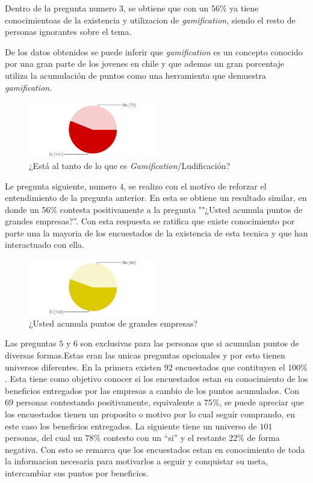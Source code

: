 Dentro de la pregunta numero 3, se obtiene que con un $56\%$ ya tiene conocimientoas de la existencia
y utilizacion de \emph{gamification}, siendo el resto de personas ignorantes sobre el tema.

De los datos obtenidos se puede inferir que \emph{gamification} es un concepto conocido por una gran parte
de los jovenes en chile y que ademas un gran porcentaje utiliza la acumulación de puntos como una
herramienta que demuestra \emph{gamification}.

\begin{figure}[!htb]
  \centering
  \includegraphics[width=0.5\textwidth]{images/chartPreg3.png}
  \caption[chart3]{¿Está al tanto de lo que es \emph{Gamification}/Ludificación?}
  \label{fig:chart1}
\end{figure}

Le pregunta siguiente, numero $4$, se realizo con el motívo de reforzar el entendimiento de la pregunta
anterior. En esta se obtiene un resultado similar, en donde un $56\%$ contesta positivamente a la
pregunta ""¿Usted acumula puntos de grandes empresas?''. Con esta respuesta se ratifica que existe
conocimiento por parte una la mayoria de los encuestados de la existencia de esta tecnica y que han
interactuado con ella.

\begin{figure}[!htb]
  \centering
  \includegraphics[width=0.5\textwidth]{images/chartPreg4.png}
  \caption[chart4]{¿Usted acumula puntos de grandes empresas?}
  \label{fig:chart2}
\end{figure}

Las preguntas $5$ y $6$ son exclusivas para las personas que si acumulan puntos de diversas formas.Estas
eran las unicas preguntas opcionales y por esto tienen universos diferentes.
En la primera existen $92$ encuestados que contituyen el $100\%$. Esta tiene como objetivo conocer
si los encuestados estan en conocimiento de los beneficios entregados por las empresas a cambio de
 los puntos acumulados. Con $69$ personas contestando positivamente, equivalente a $75\%$, se puede
apreciar que los encuestados tienen un proposito o motivo por lo cual seguir comprando, en este caso
los beneficios entregados.
La siguiente tiene un universo de $101$ personas, del cual un $78\%$ contesto con un ``si'' y el
restante $22\%$ de forma negativa. Con esto se remarca que los encuestados estan en conocimiento
de toda la informacion necesaria para motivarlos a seguir y conquistar su meta, intercambiar sus
puntos por beneficios.

